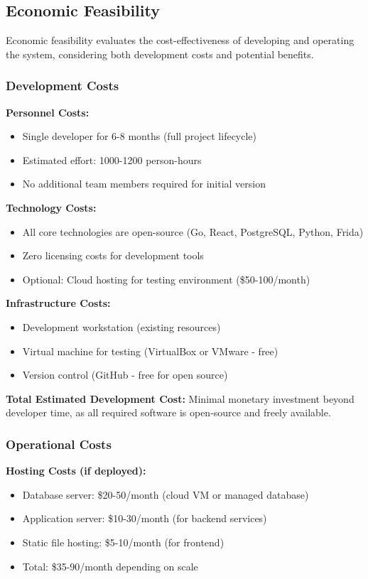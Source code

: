 \subsection{Economic Feasibility}

Economic feasibility evaluates the cost-effectiveness of developing and operating the system, considering both development costs and potential benefits.

\subsubsection{Development Costs}

\textbf{Personnel Costs:}
\begin{itemize}
    \item Single developer for 6-8 months (full project lifecycle)
    \item Estimated effort: 1000-1200 person-hours
    \item No additional team members required for initial version
\end{itemize}

\textbf{Technology Costs:}
\begin{itemize}
    \item All core technologies are open-source (Go, React, PostgreSQL, Python, Frida)
    \item Zero licensing costs for development tools
    \item Optional: Cloud hosting for testing environment (\$50-100/month)
\end{itemize}

\textbf{Infrastructure Costs:}
\begin{itemize}
    \item Development workstation (existing resources)
    \item Virtual machine for testing (VirtualBox or VMware - free)
    \item Version control (GitHub - free for open source)
\end{itemize}

\textbf{Total Estimated Development Cost:} Minimal monetary investment beyond developer time, as all required software is open-source and freely available.

\subsubsection{Operational Costs}

\textbf{Hosting Costs (if deployed):}
\begin{itemize}
    \item Database server: \$20-50/month (cloud VM or managed database)
    \item Application server: \$10-30/month (for backend services)
    \item Static file hosting: \$5-10/month (for frontend)
    \item Total: \$35-90/month depending on scale
\end{itemize}

